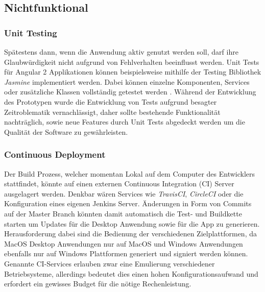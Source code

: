 \subsection{Nichtfunktional}


\subsubsection{Unit Testing}

Spätestens dann, wenn die Anwendung aktiv genutzt werden soll, darf ihre Glaubwürdigkeit nicht aufgrund von Fehlverhalten beeinflusst werden.
Unit Tests für Angular 2 Applikationen können beispielsweise mithilfe der Testing Bibliothek \emph{Jasmine} implementiert werden.
Dabei können einzelne Komponenten, Services oder zusätzliche Klassen vollständig getestet werden \cite{Angul78:online}.
Während der Entwicklung des Prototypen \projectname{} wurde die Entwicklung von Tests aufgrund besagter Zeitroblematik vernachlässigt,
daher sollte bestehende Funktionalität nachträglich, sowie neue Features durch Unit Tests abgedeckt werden um die Qualität der Software zu gewährleisten.

\subsubsection{Continuous Deployment}

Der Build Prozess, welcher momentan Lokal auf dem Computer des Entwicklers stattfindet, könnte auf einen externen Continuous Integration (CI) Server ausgelagert werden.
Denkbar wären Services wie \emph{TravisCI}, \emph{CircleCI} oder die Konfiguration eines eigenen Jenkins Server.
Änderungen in Form von Commits auf der Master Branch könnten damit automatisch die Test- und Buildkette starten um Updates für die Desktop Anwendung sowie für die App zu generieren.
Herausforderung dabei sind die Bedienung der verschiedenen Zielplattformen, da MacOS Desktop Anwendungen nur auf MacOS und
Windows Anwendungen ebenfalls nur auf Windows Plattformen generiert und signiert werden können.
Genannte CI-Services erlauben zwar eine Emulierung verschiedener Betriebsysteme,
allerdings bedeutet dies einen hohen Konfigurationsaufwand und erfordert ein gewisses Budget für die nötige Rechenleistung.
